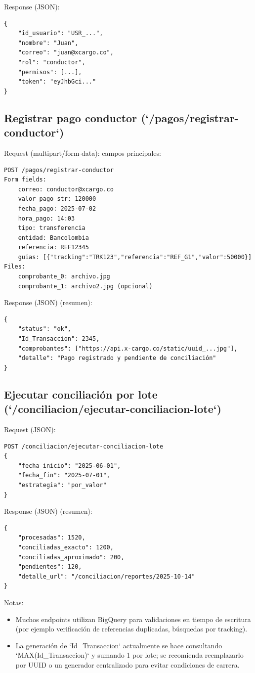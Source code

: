 Response (JSON):
\begin{verbatim}
{
    "id_usuario": "USR_...",
    "nombre": "Juan",
    "correo": "juan@xcargo.co",
    "rol": "conductor",
    "permisos": [...],
    "token": "eyJhbGci..."
}
\end{verbatim}

\subsection{Registrar pago conductor (`/pagos/registrar-conductor`)}
Request (multipart/form-data): campos principales:
\begin{verbatim}
POST /pagos/registrar-conductor
Form fields:
    correo: conductor@xcargo.co
    valor_pago_str: 120000
    fecha_pago: 2025-07-02
    hora_pago: 14:03
    tipo: transferencia
    entidad: Bancolombia
    referencia: REF12345
    guias: [{"tracking":"TRK123","referencia":"REF_G1","valor":50000}]
Files:
    comprobante_0: archivo.jpg
    comprobante_1: archivo2.jpg (opcional)
\end{verbatim}

Response (JSON) (resumen):
\begin{verbatim}
{
    "status": "ok",
    "Id_Transaccion": 2345,
    "comprobantes": ["https://api.x-cargo.co/static/uuid_...jpg"],
    "detalle": "Pago registrado y pendiente de conciliación"
}
\end{verbatim}

\subsection{Ejecutar conciliación por lote (`/conciliacion/ejecutar-conciliacion-lote`)}
Request (JSON):
\begin{verbatim}
POST /conciliacion/ejecutar-conciliacion-lote
{
    "fecha_inicio": "2025-06-01",
    "fecha_fin": "2025-07-01",
    "estrategia": "por_valor"
}
\end{verbatim}

Response (JSON) (resumen):
\begin{verbatim}
{
    "procesadas": 1520,
    "conciliadas_exacto": 1200,
    "conciliadas_aproximado": 200,
    "pendientes": 120,
    "detalle_url": "/conciliacion/reportes/2025-10-14"
}
\end{verbatim}


Notas:
\begin{itemize}
\item Muchos endpoints utilizan BigQuery para validaciones en tiempo de escritura (por ejemplo verificación de referencias duplicadas, búsquedas por tracking).
\item La generación de `Id_Transaccion` actualmente se hace consultando `MAX(Id_Transaccion)` y sumando 1 por lote; se recomienda reemplazarlo por UUID o un generador centralizado para evitar condiciones de carrera.
\end{itemize}


